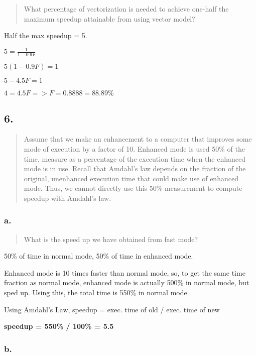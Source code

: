 \documentclass[]{article}
\begin{document}
\begin{quote}
What percentage of vectorization is needed to achieve one-half the
maximum speedup attainable from using vector model?
\end{quote}

Half the max speedup = 5.

\(5 = \frac{1}{1-0.9F}\)

\(5(1-0.9F) = 1\)

\(5 - 4.5F = 1\)

\(4 = 4.5F => F = 0.8888 = 88.89\%\)

\subsection{6.}\label{header-n5170}

\begin{quote}
Assume that we make an enhancement to a computer that improves some mode
of execution by a factor of 10. Enhanced mode is used 50\% of the time,
measure as a percentage of the execution time when the enhanced mode is
in use. Recall that Amdahl's law depends on the fraction of the
original, unenhanced execution time that could make use of enhanced
mode. Thus, we cannot directly use this 50\% measurement to compute
speedup with Amdahl's law.
\end{quote}

\subsubsection{a.}\label{header-n5174}

\begin{quote}
What is the speed up we have obtained from fast mode?
\end{quote}

50\% of time in normal mode, 50\% of time in enhanced mode.

Enhanced mode is 10 times faster than normal mode, so, to get the same
time fraction as normal mode, enhanced mode is actually 500\% in normal
mode, but sped up. Using this, the total time is 550\% in normal mode.

Using Amdahl's Law, speedup = exec. time of old / exec. time of new

\textbf{speedup = 550\% / 100\% = 5.5}

\subsubsection{b.}\label{header-n5186}
\end{document}

